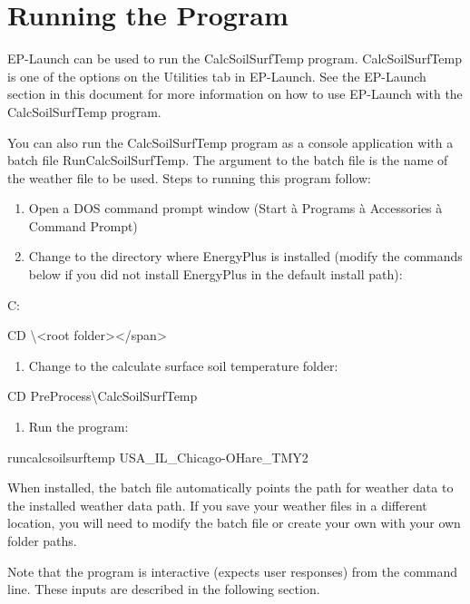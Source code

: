 \section{Running the Program}\label{running-the-program}

EP-Launch can be used to run the CalcSoilSurfTemp program. CalcSoilSurfTemp is one of the options on the Utilities tab in EP-Launch. See the EP-Launch section in this document for more information on how to use EP-Launch with the CalcSoilSurfTemp program.

You can also run the CalcSoilSurfTemp program as a console application with a batch file RunCalcSoilSurfTemp. The argument to the batch file is the name of the weather file to be used. Steps to running this program follow:

\begin{enumerate}
\def\labelenumi{\arabic{enumi})}
\item
  Open a DOS command prompt window (Start à Programs à Accessories à Command Prompt)
\item
  Change to the directory where EnergyPlus is installed (modify the commands below if you did not install EnergyPlus in the default install path):
\end{enumerate}

C:

CD \textbackslash{}\textless{}root folder\textgreater{}\textless{}/span\textgreater{}

\begin{enumerate}
\def\labelenumi{\arabic{enumi})}
\setcounter{enumi}{2}
\tightlist
\item
  Change to the calculate surface soil temperature folder:
\end{enumerate}

CD PreProcess\textbackslash{}CalcSoilSurfTemp

\begin{enumerate}
\def\labelenumi{\arabic{enumi})}
\setcounter{enumi}{3}
\tightlist
\item
  Run the program:
\end{enumerate}

runcalcsoilsurftemp USA\_IL\_Chicago-OHare\_TMY2

When installed, the batch file automatically points the path for weather data to the installed weather data path. If you save your weather files in a different location, you will need to modify the batch file or create your own with your own folder paths.

Note that the program is interactive (expects user responses) from the command line. These inputs are described in the following section.
